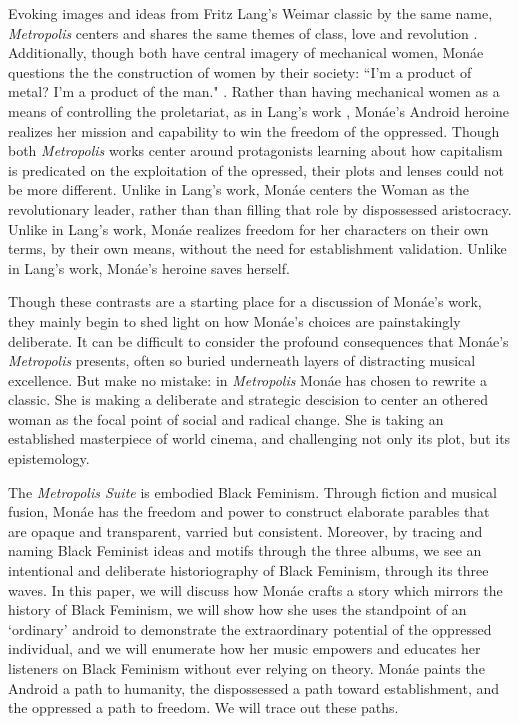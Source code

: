 \documentclass[a4paper, 11pt]{article} %
\begin{document}
Evoking images and ideas from Fritz Lang's Weimar classic by the same name, \emph{Metropolis} centers and shares the same themes of class, love and revolution \cite{metropolis}.
Additionally, though both have central imagery of mechanical women, Mon\'ae questions the the construction of women by their society: ``I'm a product of metal? I'm a product of the man." \cite{happyhunting}. 
Rather than having mechanical women as a means of controlling the proletariat, as in Lang's work \cite{metropolis}, Mon\'ae's Android heroine realizes her mission and capability to win the freedom of the oppressed.
Though both \emph{Metropolis} works center around protagonists learning about how capitalism is predicated on the exploitation of the opressed, their plots and lenses could not be more different.
Unlike in Lang's work, Mon\'ae centers the Woman as the revolutionary leader, rather than than filling that role by dispossessed aristocracy.
Unlike in Lang's work, Mon\'ae realizes freedom for her characters on their own terms, by their own means, without the need for establishment validation.
Unlike in Lang's work, Mon\'ae's heroine saves herself.

Though these contrasts are a starting place for a discussion of Mon\'ae's work, they mainly begin to shed light on how Mon\'ae's choices are painstakingly deliberate.
It can be difficult to consider the profound consequences that Mon\'ae's \emph{Metropolis} presents, often so buried underneath layers of distracting musical excellence.
But make no mistake: in \emph{Metropolis} Mon\'ae has chosen to rewrite a classic.
She is making a deliberate and strategic descision to center an othered woman as the focal point of social and radical change.
She is taking an established masterpiece of world cinema, and challenging not only its plot, but its epistemology.

The \emph{Metropolis Suite} is embodied Black Feminism.
Through fiction and musical fusion, Mon\'ae has the freedom and power to construct elaborate parables that are opaque and transparent, varried but consistent.
Moreover, by tracing and naming Black Feminist ideas and motifs through the three albums, we see an intentional and deliberate historiography of Black Feminism, through its three waves.
In this paper, we will discuss how Mon\'ae crafts a story which mirrors the history of Black Feminism, we will show how she uses the standpoint of an `ordinary' android to demonstrate the extraordinary potential of the oppressed individual, and we will enumerate how her music empowers and educates her listeners on Black Feminism without ever relying on theory.
Mon\'ae paints the Android a path to humanity, the dispossessed a path toward establishment, and the oppressed a path to freedom.
We will trace out these paths. 
\end{document}
